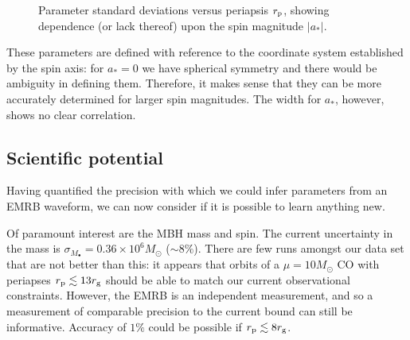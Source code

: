 \begin{figure}[!htp]
\begin{center}
 \quad
{}
\caption{Parameter standard deviations versus periapsis $r_\mathrm{p}$, showing dependence (or lack thereof) upon the spin magnitude $|a_\ast|$.\label{fig:sigmas-spin}}
\end{center}
\end{figure}
These parameters are defined with reference to the coordinate system established by the spin axis: for $a_\ast = 0$ we have spherical symmetry and there would be ambiguity in defining them. Therefore, it makes sense that they can be more accurately determined for larger spin magnitudes. The width for $a_\ast$, however, shows no clear correlation.

\subsection{Scientific potential}

Having quantified the precision with which we could infer parameters from an EMRB waveform, we can now consider if it is possible to learn anything new.

Of paramount interest are the MBH mass and spin. The current uncertainty in the mass is $\sigma_{M_\bullet} = 0.36 \times 10^6 M_\odot$ ($\sim 8\%$). There are few runs amongst our data set that are not better than this: it appears that orbits of a $\mu = 10 M_\odot$ CO with periapses $r_\mathrm{p} \lesssim 13 r_\mathrm{g}$ should be able to match our current observational constraints. However, the EMRB is an independent measurement, and so a measurement of comparable precision to the current bound can still be informative. Accuracy of $1\%$ could be possible if $r_\mathrm{p} \lesssim 8 r_\mathrm{g}$.

